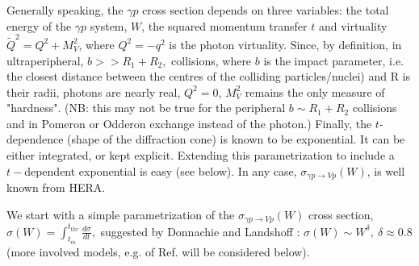 \documentclass[12pt]{article}
\begin{document}
Generally speaking, the $\gamma p$ cross section depends on three variables: the total energy of the $\gamma p$ system, $W$,
the squared momentum transfer $t$ and virtuality $\tilde Q^2=Q^2+M_V^2$, where $Q^2=-q^2$ is the photon virtuality. Since, by definition, in ultraperipheral, $b>>R_1+R_2,$
collisions, where $b$ is the impact parameter, i.e. the closest distance between the centres of the colliding particles/nuclei) and R is their radii,
photons are nearly real, $Q^2=0$, $M_V^2$ remains the only measure of "hardness". (NB: this may not be true for the peripheral $b\sim R_1+R_2$ collisions and in
Pomeron or Odderon exchange instead of the photon.) Finally, the $t$-dependence (shape of the diffraction cone) is known to be exponential. It can be either integrated, or 
kept explicit. Extending this parametrization to include a $t-$dependent exponential is easy (see below).
In any case, $\sigma_{\gamma p\rightarrow Vp}(W)$, is well known from HERA.

We start with a simple parametrization of the $\sigma_{\gamma p\rightarrow Vp}(W)$ cross section, $\sigma(W)=\int_{t_m}^{t_{thr}}\frac{d\sigma}{dt},$
suggested by Donnachie and Landshoff \cite{DL}: $\sigma(W)\sim W^{\delta},\ \delta\approx 0.8$ (more involved models, e.g. of Ref. \cite{Capua, Fazio}
will be considered below).
\end{document}

